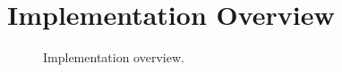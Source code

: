 \section{Implementation Overview}

\begin{figure}
  
  \caption{Implementation overview.}
  
\end{figure}
